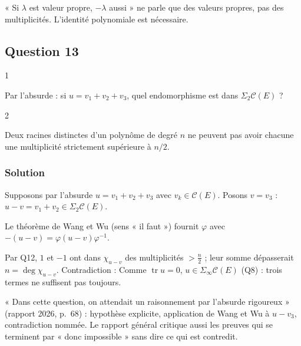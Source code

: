 \documentclass[11pt,a4paper]{article}
\newcommand{\equationajustee}[1]{%
  \sbox{\boiteequation}{$\displaystyle #1$}%
  \ifdim\wd\boiteequation>\linewidth
    \[\resizebox{\linewidth}{!}{\usebox{\boiteequation}}\]%
  \else
    \[#1\]%
  \fi}
\begin{document}
\begin{piege}

« Si \(\lambda\) est valeur propre, \(-\lambda\) aussi » ne parle que des valeurs propres, pas des multiplicités. L'identité polynomiale est nécessaire.

\end{piege}

\hypertarget{question-13}{%
\subsection{Question 13}\label{question-13}}

\begin{indication}{1}

Par l'absurde : si \(u=v_1+v_2+v_3\), quel endomorphisme est dans \(\Sigma_2\mathcal C(E)\) ?

\end{indication}

\begin{indication}{2}

Deux racines distinctes d'un polynôme de degré \(n\) ne peuvent pas avoir chacune une multiplicité strictement supérieure à \(n/2\).

\end{indication}

\hypertarget{solution-12}{%
\subsubsection{Solution}\label{solution-12}}

Supposons par l'absurde \(u=v_1+v_2+v_3\) avec \(v_k\in\mathcal C(E)\). Posons \(v=v_3\) : \(u-v=v_1+v_2\in\Sigma_2\mathcal C(E)\).

Le théorème de Wang et Wu (sens « il faut ») fournit \(\varphi\) avec \(-(u-v)=\varphi(u-v)\varphi^{-1}\).

Par Q12, \(1\) et \(-1\) ont dans \(\chi_{u-v}\) des multiplicités \(>\frac n2\) ; leur somme dépasserait \(n=\deg\chi_{u-v}\). Contradiction :
\equationajustee{\boxed{u\notin\Sigma_3\mathcal C(E).}}
Comme \(\operatorname{tr}u=0\), \(u\in\Sigma_\infty\mathcal C(E)\) (Q8) : trois termes ne suffisent pas toujours.

\begin{jury}

« Dans cette question, on attendait un raisonnement par l'absurde rigoureux » (rapport 2026, p.~68) : hypothèse explicite, application de Wang et Wu à \(u-v_3\), contradiction nommée. Le rapport général critique aussi les preuves qui se terminent par « donc impossible » sans dire ce qui est contredit.

\end{jury}
\end{document}
